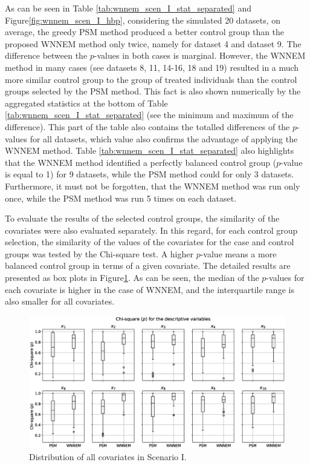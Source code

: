 		As can be seen in Table \ref{tab:wnnem_scen_I_stat_separated} and Figure\ref{fig:wnnem_scen_I_hbp}, considering the simulated 20 datasets, on average, the greedy PSM method produced a better control group than the proposed WNNEM method only twice, namely for dataset 4 and dataset 9. The difference between the $p$-values in both cases is marginal. However, the WNNEM method in many cases (see datasets 8, 11, 14-16, 18 and 19) resulted in a much more similar control group to the group of treated individuals than the control groups selected by the PSM method. This fact is also shown numerically by the aggregated statistics at the bottom of Table \ref{tab:wnnem_scen_I_stat_separated} (see the minimum and maximum of the difference). This part of the table also contains the totalled differences of the $p$-values for all datasets, which value also confirms the advantage of applying the WNNEM method. Table \ref{tab:wnnem_scen_I_stat_separated} also highlights that the WNNEM method identified a perfectly balanced control group ($p$-value is equal to 1) for 9 datasets, while the PSM method could for only 3 datasets. Furthermore, it must not be forgotten, that the WNNEM method was run only once, while the PSM method was run 5 times on each dataset. 
								
		To evaluate the results of the selected control groups, the similarity of the covariates were also evaluated separately. In this regard, for each control group selection, the similarity of the values of the covariates for the case and control groups was tested by the Chi-square test. A higher $p$-value means a more balanced control group in terms of a given covariate. The detailed results are presented as box plots in Figure\ref{fig:wnnem_scen_I_distribution}. As can be seen, the median of the $p$-values for each covariate is higher in the case of WNNEM, and the interquartile range is also smaller for all covariates.
								
		\begin{figure}[h]
			\centering
                \captionsetup{justification=centering}
			\includegraphics[width=\textwidth]{assets/figures/control_group_selection/wnnem/scenI/distribution.eps}
			\caption{Distribution of all covariates in Scenario I. %
   }
			\label{fig:wnnem_scen_I_distribution}    
		\end{figure}

